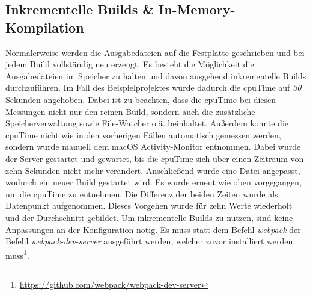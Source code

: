 \documentclass[11pt]{report}
\begin{document}
    		\subsection{Inkrementelle Builds \& In-Memory-Kompilation}
    			\label{section:incrementalBuilds}
    			Normalerweise werden die Ausgabedateien auf die Festplatte geschrieben und bei jedem Build vollständig neu erzeugt. Es besteht die Möglichkeit die Ausgabedateien im Speicher zu halten und davon ausgehend inkrementelle Builds durchzuführen. Im Fall des Beispielprojektes wurde dadurch die \Gls{cpuTime} auf \emph{30} Sekunden angehoben. Dabei ist zu beachten, dass die \Gls{cpuTime} bei diesen Messungen nicht nur den reinen Build, sondern auch die zusätzliche Speicherverwaltung sowie File-Watcher o.ä. beinhaltet. Außerdem konnte die \Gls{cpuTime} nicht wie in den vorherigen Fällen automatisch gemessen werden, sondern wurde manuell dem macOS Activity-Monitor entnommen. Dabei wurde der Server gestartet und gewartet, bis die \Gls{cpuTime} sich über einen Zeitraum von zehn Sekunden nicht mehr verändert. Anschließend wurde eine Datei angepasst, wodurch ein neuer Build gestartet wird. Es wurde erneut wie oben vorgegangen, um die \Gls{cpuTime} zu entnehmen. Die Differenz der beiden Zeiten wurde als Datenpunkt aufgenommen. Dieses Vorgehen wurde für zehn Werte wiederholt und der Durchschnitt gebildet. Um inkrementelle Builds zu nutzen, sind keine Anpassungen an der Konfiguration nötig. Es muss statt dem Befehl \emph{webpack} der Befehl \emph{webpack-dev-server} ausgeführt werden, welcher zuvor installiert werden muss\footnote{\url{https://github.com/webpack/webpack-dev-server}}.
\end{document}
